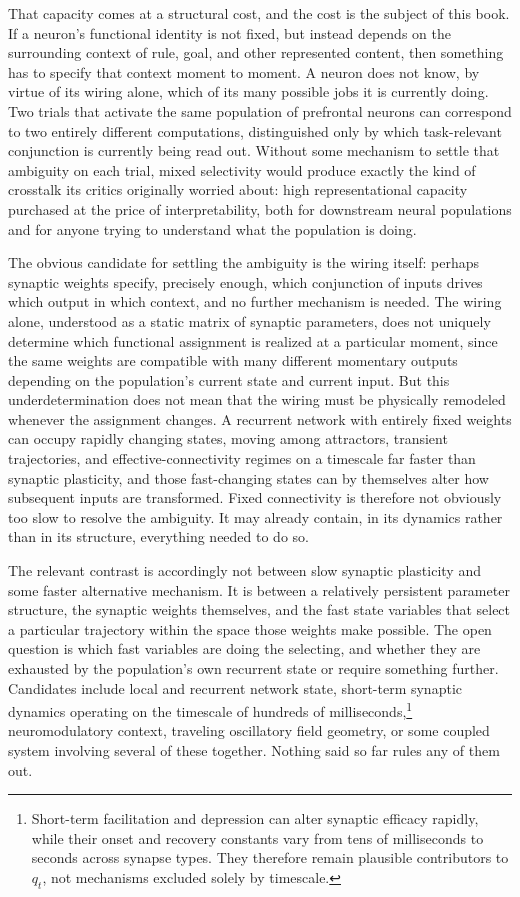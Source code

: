 \documentclass[11pt]{book}
\begin{document}
That capacity comes at a structural cost, and the cost is the subject of this book. If a neuron's functional identity is not fixed, but instead depends on the surrounding context of rule, goal, and other represented content, then something has to specify that context moment to moment. A neuron does not know, by virtue of its wiring alone, which of its many possible jobs it is currently doing. Two trials that activate the same population of prefrontal neurons can correspond to two entirely different computations, distinguished only by which task-relevant conjunction is currently being read out. Without some mechanism to settle that ambiguity on each trial, mixed selectivity would produce exactly the kind of crosstalk its critics originally worried about: high representational capacity purchased at the price of interpretability, both for downstream neural populations and for anyone trying to understand what the population is doing.

The obvious candidate for settling the ambiguity is the wiring itself: perhaps synaptic weights specify, precisely enough, which conjunction of inputs drives which output in which context, and no further mechanism is needed. The wiring alone, understood as a static matrix of synaptic parameters, does not uniquely determine which functional assignment is realized at a particular moment, since the same weights are compatible with many different momentary outputs depending on the population's current state and current input. But this underdetermination does not mean that the wiring must be physically remodeled whenever the assignment changes. A recurrent network with entirely fixed weights can occupy rapidly changing states, moving among attractors, transient trajectories, and effective-connectivity regimes on a timescale far faster than synaptic plasticity, and those fast-changing states can by themselves alter how subsequent inputs are transformed. Fixed connectivity is therefore not obviously too slow to resolve the ambiguity. It may already contain, in its dynamics rather than in its structure, everything needed to do so.

The relevant contrast is accordingly not between slow synaptic plasticity and some faster alternative mechanism. It is between a relatively persistent parameter structure, the synaptic weights themselves, and the fast state variables that select a particular trajectory within the space those weights make possible. The open question is which fast variables are doing the selecting, and whether they are exhausted by the population's own recurrent state or require something further. Candidates include local and recurrent network state, short-term synaptic dynamics operating on the timescale of hundreds of milliseconds,\footnote{Short-term facilitation and depression can alter synaptic efficacy rapidly, while their onset and recovery constants vary from tens of milliseconds to seconds across synapse types. They therefore remain plausible contributors to $q_t$, not mechanisms excluded solely by timescale.} neuromodulatory context, traveling oscillatory field geometry, or some coupled system involving several of these together. Nothing said so far rules any of them out.
\end{document}
